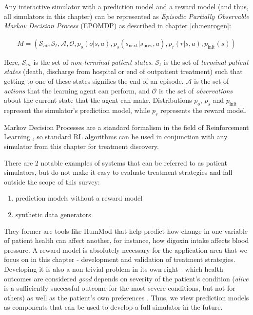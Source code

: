 Any interactive simulator with a prediction model and a reward model (and thus, all simulators in this chapter) can be represented as {\em Episodic Partially Observable Markov Decision Process} (EPOMDP) as described in chapter \ref{ch:neurogen}:

\begin{multline}
M = (\mathcal{S}_{nt}, \mathcal{S}_t, \mathcal{A}, \mathcal{O}, p_o(o | s, a), p_s(s_\text{next} | s_\text{prev}, a), p_r(r | s, a), p_\text{init}(s))
\end{multline}

Here, $\mathcal{S}_{nt}$ is the set of {\em non-terminal patient states}. $\mathcal{S}_{t}$ is the set of {\em terminal patient states} (death, discharge from hospital or end of outpatient treatment) such that getting to one of these states signifies the end of an episode. 
$\mathcal{A}$ is the set of {\em actions} that the learning agent can perform, and $\mathcal{O}$ is the set of {\em observations} about the current state that the agent can make. 
Distributions $p_o$, $p_s$ and $p_\text{init}$ represent the simulator's prediction model, while $p_r$ represents the reward model.

Markov Decision Processes are a standard formalism in the field of Reinforcement Learning \cite{suttonReinforcementLearningSecond2018}, so standard RL algorithms can be used in conjunction with any simulator from this chapter for treatment discovery.

There are 2 notable examples of systems that can be referred to as patient simulators, but do not make it easy to evaluate treatment strategies and fall outside the scope of this survey: 
\begin{enumerate}
    \item prediction models without a reward model
    \item synthetic data generators \cite{datagens}
\end{enumerate}

They former are tools like HumMod \cite{hummod} that help predict how change in one variable of patient health can affect another, for instance, how digoxin intake affects blood pressure.
A reward model is absolutely necessary for the application area that we focus on in this chapter - development and validation of treatment strategies.
Developing it is also a non-trivial problem in its own right - which health outcomes are considered \emph{good} depends on severity of the patient's condition (\emph{alive} is a sufficiently successful outcome for the most severe conditions, but not for others) as well as the patient's own preferences \cite{patpreferences1,patpreferences2}.
Thus, we view prediction models as components that can be used to develop a full simulator in the future.

